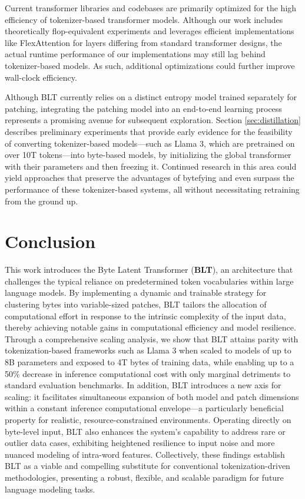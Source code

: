 Current transformer libraries and codebases are primarily optimized for the high efficiency of tokenizer-based transformer models. Although our work includes theoretically flop-equivalent experiments and leverages efficient implementations like FlexAttention for layers differing from standard transformer designs, the actual runtime performance of our implementations may still lag behind tokenizer-based models. As such, additional optimizations could further improve wall-clock efficiency.

Although {\textsc BLT} currently relies on a distinct entropy model trained separately for patching, integrating the patching model into an end-to-end learning process represents a promising avenue for subsequent exploration. Section \ref{sec:distillation} describes preliminary experiments that provide early evidence for the feasibility of converting tokenizer-based models—such as Llama 3, which are pretrained on over 10T tokens—into byte-based models, by initializing the global transformer with their parameters and then freezing it. Continued research in this area could yield approaches that preserve the advantages of bytefying and even surpass the performance of these tokenizer-based systems, all without necessitating retraining from the ground up.

\section{Conclusion}
\label{section:conclusion}

This work introduces the Byte Latent Transformer (\textbf{BLT}), an architecture that challenges the typical reliance on predetermined token vocabularies within large language models. By implementing a dynamic and trainable strategy for clustering bytes into variable-sized patches, {\textsc BLT} tailors the allocation of computational effort in response to the intrinsic complexity of the input data, thereby achieving notable gains in computational efficiency and model resilience. Through a comprehensive scaling analysis, we show that {\textsc BLT} attains parity with tokenization-based frameworks such as Llama 3 when scaled to models of up to 8B parameters and exposed to 4T bytes of training data, while enabling up to a 50\% decrease in inference computational cost with only marginal detriments to standard evaluation benchmarks. In addition, {\textsc BLT} introduces a new axis for scaling: it facilitates simultaneous expansion of both model and patch dimensions within a constant inference computational envelope—a particularly beneficial property for realistic, resource-constrained environments. Operating directly on byte-level input, {\textsc BLT} also enhances the system’s capability to address rare or outlier data cases, exhibiting heightened resilience to input noise and more nuanced modeling of intra-word features. Collectively, these findings establish {\textsc BLT} as a viable and compelling substitute for conventional tokenization-driven methodologies, presenting a robust, flexible, and scalable paradigm for future language modeling tasks.

